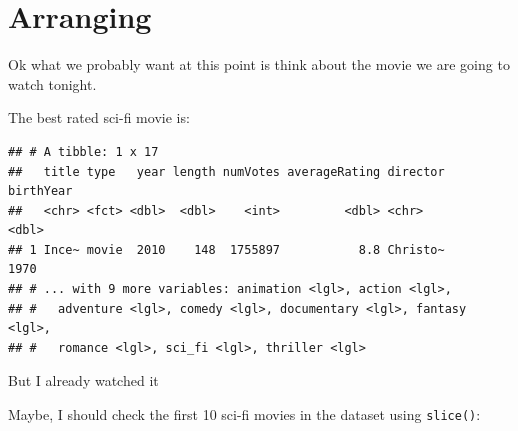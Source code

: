 \documentclass[]{book}
\newenvironment{Shaded}{\begin{snugshade}}{\end{snugshade}}
\newcommand{\DecValTok}[1]{\textcolor[rgb]{0.00,0.00,0.81}{#1}}
\newcommand{\KeywordTok}[1]{\textcolor[rgb]{0.13,0.29,0.53}{\textbf{#1}}}
\newcommand{\NormalTok}[1]{#1}
\newcommand{\OperatorTok}[1]{\textcolor[rgb]{0.81,0.36,0.00}{\textbf{#1}}}
\newcommand{\StringTok}[1]{\textcolor[rgb]{0.31,0.60,0.02}{#1}}
\begin{document}
\hypertarget{arranging}{%
\section{Arranging}\label{arranging}}

Ok what we probably want at this point is think about the movie we are going to watch tonight.

The best rated sci-fi movie is:

\begin{Shaded}
\end{Shaded}

\begin{verbatim}
## # A tibble: 1 x 17
##   title type   year length numVotes averageRating director birthYear
##   <chr> <fct> <dbl>  <dbl>    <int>         <dbl> <chr>        <dbl>
## 1 Ince~ movie  2010    148  1755897           8.8 Christo~      1970
## # ... with 9 more variables: animation <lgl>, action <lgl>,
## #   adventure <lgl>, comedy <lgl>, documentary <lgl>, fantasy <lgl>,
## #   romance <lgl>, sci_fi <lgl>, thriller <lgl>
\end{verbatim}

But I already watched it

Maybe, I should check the first 10 sci-fi movies in the dataset using \texttt{slice()}:

\begin{Shaded}
\end{Shaded}
\end{document}

